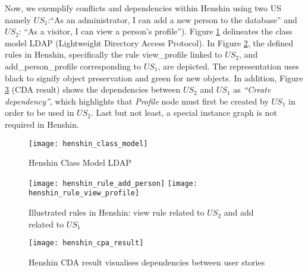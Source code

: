 \begin{example}
Now, we exemplify conflicts and dependencies within Henshin using two US namely $US_1$:\enquote{As an administrator, I can add a new person to the database} and $US_2$: \enquote{As a visitor, I can view a person's profile}). Figure \ref{fig:henshin_model} delineates the  class model LDAP (Lightweight Directory Access Protocol). In Figure \ref{fig:henshin_rule}, the defined rules in Henshin, specifically the rule view\_profile linked to $US_2$, and add\_person\_profile corresponding to $US_1$, are depicted. The representation uses black to signify object preservation and green for new objects. In addition, Figure \ref{henshin_cpa_result} (CDA result) shows the dependencies between $US_2$ and $US_1$ as \emph{\enquote{Create dependency}}, which highlights that \emph{Profile} node must first be created by $US_1$ in order to be used in $US_2$. Last but not least, a special instance graph is not required in Henshin.
\begin{figure}

\centering
\texttt{[image: henshin\_class\_model]}
\caption{Henshin Class Model LDAP}\label{fig:henshin_model}
\end{figure}
\begin{figure}
\texttt{[image: henshin\_rule\_add\_person]}
\texttt{[image: henshin\_rule\_view\_profile]}
\caption{Illustrated rules in Henshin: view rule related to $US_2$ and add related to $US_1$}\label{fig:henshin_rule}
\end{figure}
\begin{figure}
\center
\texttt{[image: henshin\_cpa\_result]}
\caption{Henshin CDA result visualises dependencies between user stories}\label{henshin_cpa_result}
\end{figure}
\end{example}
